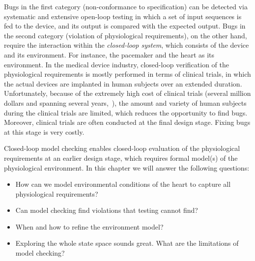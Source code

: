 Bugs in the first category (non-conformance to specification) can be detected via systematic and extensive open-loop testing in which a set of input sequences is fed to the device, and its output is compared with the expected output.
Bugs in the second category (violation of physiological requirements), on the other hand, require the interaction within the \emph{closed-loop system}, which consists of the device and its environment.
For instance, the pacemaker and the heart as its environment. 
In the medical device industry, closed-loop verification of the physiological requirements is mostly performed in terms of clinical trials, in which the actual devices are implanted in human subjects over an extended duration.
Unfortunately, because of the extremely high cost of clinical trials (several million dollars and spanning several years,~\cite{trialcost}), the amount and variety of human subjects during the clinical trials are limited, which reduces the opportunity to find bugs. 
Moreover, clinical trials are often conducted at the final design stage. Fixing bugs at this stage is very costly.

Closed-loop model checking enables closed-loop evaluation of the physiological requirements at an earlier design stage, which requires formal model(s) of the physiological environment. In this chapter we will answer the following questions:
\begin{itemize}
	\vspace{-5pt}
	\item How can we model environmental conditions of the heart to capture all physiological requirements?
	\vspace{-5pt}
	\item Can model checking find violations that testing cannot find?
	\vspace{-5pt}
	\item When and how to refine the environment model?
        \vspace{-5pt}
        \item Exploring the whole state space sounds great. What are the limitations of model checking? 
\end{itemize}

